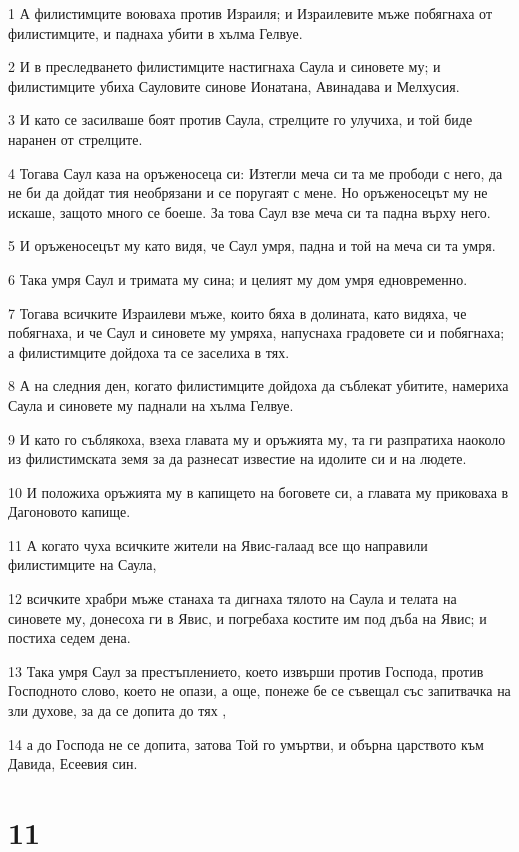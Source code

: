 \par 1 А филистимците воюваха против Израиля; и Израилевите мъже побягнаха от филистимците, и паднаха убити в хълма Гелвуе.
\par 2 И в преследването филистимците настигнаха Саула и синовете му; и филистимците убиха Сауловите синове Ионатана, Авинадава и Мелхусия.
\par 3 И като се засилваше боят против Саула, стрелците го улучиха, и той биде наранен от стрелците.
\par 4 Тогава Саул каза на оръженосеца си: Изтегли меча си та ме прободи с него, да не би да дойдат тия необрязани и се поругаят с мене. Но оръженосецът му не искаше, защото много се боеше. За това Саул взе меча си та падна върху него.
\par 5 И оръженосецът му като видя, че Саул умря, падна и той на меча си та умря.
\par 6 Така умря Саул и тримата му сина; и целият му дом умря едновременно.
\par 7 Тогава всичките Израилеви мъже, които бяха в долината, като видяха, че побягнаха, и че Саул и синовете му умряха, напуснаха градовете си и побягнаха; а филистимците дойдоха та се заселиха в тях.
\par 8 А на следния ден, когато филистимците дойдоха да съблекат убитите, намериха Саула и синовете му паднали на хълма Гелвуе.
\par 9 И като го съблякоха, взеха главата му и оръжията му, та ги разпратиха наоколо из филистимската земя за да разнесат известие на идолите си и на людете.
\par 10 И положиха оръжията му в капището на боговете си, а главата му приковаха в Дагоновото капище.
\par 11 А когато чуха всичките жители на Явис-галаад все що направили филистимците на Саула,
\par 12 всичките храбри мъже станаха та дигнаха тялото на Саула и телата на синовете му, донесоха ги в Явис, и погребаха костите им под дъба на Явис; и постиха седем дена.
\par 13 Така умря Саул за престъплението, което извърши против Господа, против Господното слово, което не опази, а още, понеже бе се съвещал със запитвачка на зли духове, за да се допита до тях ,
\par 14 а до Господа не се допита, затова Той го умъртви, и обърна царството към Давида, Есеевия син.

\chapter{11}

